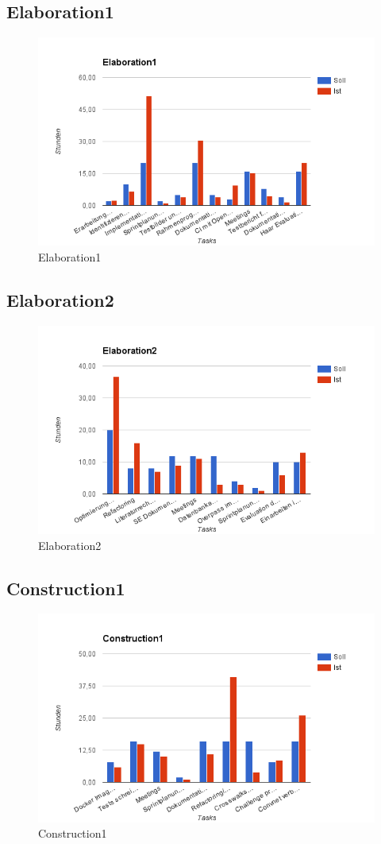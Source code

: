 \subsection{Elaboration1}
\begin{figure}[H]
\includegraphics[width=\textwidth]{images/elab1.png}
\caption[Elaboration1]{Elaboration1}
\end{figure}

\subsection{Elaboration2}
\begin{figure}[H]
\includegraphics[width=\textwidth]{images/elab2.png}
\caption[Elaboration2]{Elaboration2}
\end{figure}

\subsection{Construction1}
\begin{figure}[H]
\includegraphics[width=\textwidth]{images/construction1.png}
\caption[Construction1]{Construction1}
\end{figure}
